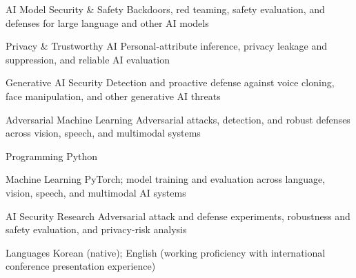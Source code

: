 
\begin{cvskills}
  \cvskill
    {AI Model Security \& Safety}
    {Backdoors, red teaming, safety evaluation, and defenses for large language and other AI models}

  \cvskill
    {Privacy \& Trustworthy AI}
    {Personal-attribute inference, privacy leakage and suppression, and reliable AI evaluation}

  \cvskill
    {Generative AI Security}
    {Detection and proactive defense against voice cloning, face manipulation, and other generative AI threats}

  \cvskill
    {Adversarial Machine Learning}
    {Adversarial attacks, detection, and robust defenses across vision, speech, and multimodal systems}
\end{cvskills}


\begin{cvskills}
  \cvskill
    {Programming}
    {Python}

  \cvskill
    {Machine Learning}
    {PyTorch; model training and evaluation across language, vision, speech, and multimodal AI systems}

  \cvskill
    {AI Security Research}
    {Adversarial attack and defense experiments, robustness and safety evaluation, and privacy-risk analysis}

  \cvskill
    {Languages}
    {Korean (native); English (working proficiency with international conference presentation experience)}
\end{cvskills}
